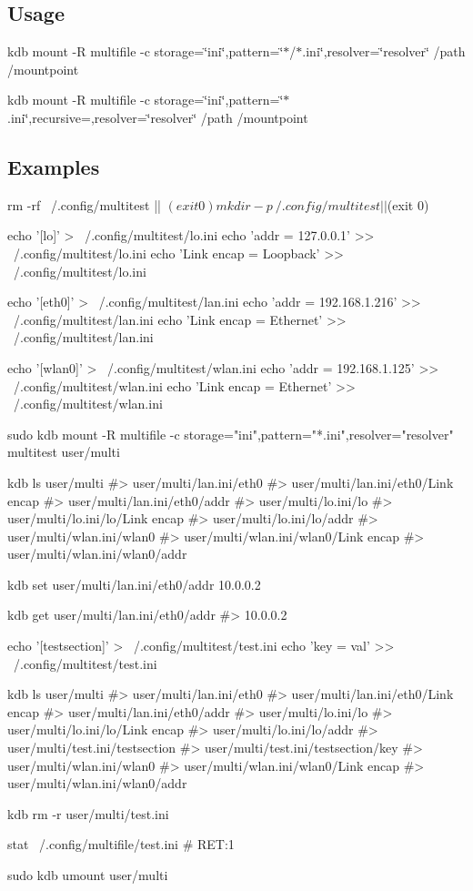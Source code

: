 \subsection*{Usage}

{\ttfamily kdb mount -\/R multifile -\/c storage=\char`\"{}ini\char`\"{},pattern=\char`\"{}$\ast$/$\ast$.\+ini\char`\"{},resolver=\char`\"{}resolver\char`\"{} /path /mountpoint}

{\ttfamily kdb mount -\/R multifile -\/c storage=\char`\"{}ini\char`\"{},pattern=\char`\"{}$\ast$.\+ini\char`\"{},recursive=,resolver=\char`\"{}resolver\char`\"{} /path /mountpoint}

\subsection*{Examples}


\begin{DoxyCode}
rm -rf ~/.config/multitest || $(exit 0)
mkdir -p ~/.config/multitest || $(exit 0)

echo '[lo]'             >  ~/.config/multitest/lo.ini
echo 'addr = 127.0.0.1' >> ~/.config/multitest/lo.ini
echo 'Link encap = Loopback' >> ~/.config/multitest/lo.ini

echo '[eth0]'                >  ~/.config/multitest/lan.ini
echo 'addr = 192.168.1.216'  >> ~/.config/multitest/lan.ini
echo 'Link encap = Ethernet' >> ~/.config/multitest/lan.ini

echo '[wlan0]'               >  ~/.config/multitest/wlan.ini
echo 'addr = 192.168.1.125'  >> ~/.config/multitest/wlan.ini
echo 'Link encap = Ethernet' >> ~/.config/multitest/wlan.ini

sudo kdb mount -R multifile -c storage="ini",pattern="*.ini",resolver="resolver" multitest user/multi

kdb ls user/multi
#> user/multi/lan.ini/eth0
#> user/multi/lan.ini/eth0/Link encap
#> user/multi/lan.ini/eth0/addr
#> user/multi/lo.ini/lo
#> user/multi/lo.ini/lo/Link encap
#> user/multi/lo.ini/lo/addr
#> user/multi/wlan.ini/wlan0
#> user/multi/wlan.ini/wlan0/Link encap
#> user/multi/wlan.ini/wlan0/addr

kdb set user/multi/lan.ini/eth0/addr 10.0.0.2

kdb get user/multi/lan.ini/eth0/addr
#> 10.0.0.2

echo '[testsection]' >  ~/.config/multitest/test.ini
echo 'key = val'     >> ~/.config/multitest/test.ini

kdb ls user/multi
#> user/multi/lan.ini/eth0
#> user/multi/lan.ini/eth0/Link encap
#> user/multi/lan.ini/eth0/addr
#> user/multi/lo.ini/lo
#> user/multi/lo.ini/lo/Link encap
#> user/multi/lo.ini/lo/addr
#> user/multi/test.ini/testsection
#> user/multi/test.ini/testsection/key
#> user/multi/wlan.ini/wlan0
#> user/multi/wlan.ini/wlan0/Link encap
#> user/multi/wlan.ini/wlan0/addr

kdb rm -r user/multi/test.ini

stat ~/.config/multifile/test.ini
# RET:1

sudo kdb umount user/multi
\end{DoxyCode}


